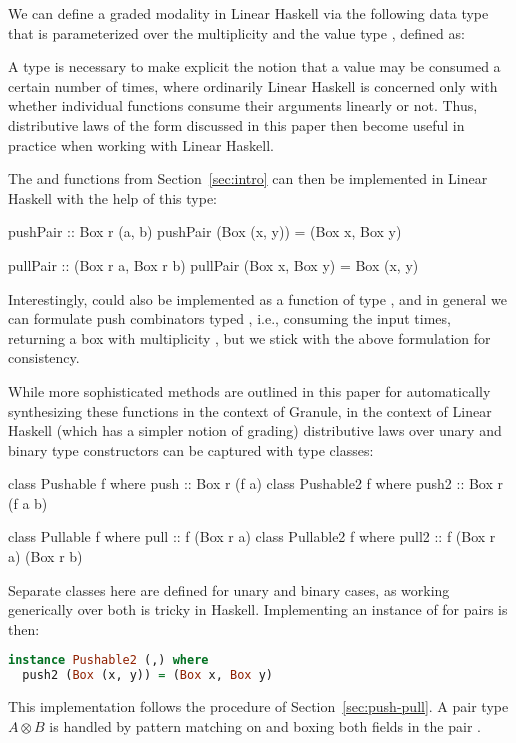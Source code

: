 We can define a graded modality in Linear Haskell
via the following  data type that is parameterized
over the multiplicity  and the value type , defined as:
%
%
A  type is necessary
to make explicit the notion that a value may be consumed a certain number of times,
where ordinarily Linear Haskell is concerned only with whether individual functions
consume their arguments linearly or not.
Thus, distributive laws of the form discussed in this paper
then become useful in practice when working with Linear Haskell.

The  and  functions from Section~\ref{sec:intro}
can then be implemented in Linear Haskell with the help of this  type:
%
\begin{haskell}
pushPair :: Box r (a, b) %
pushPair (Box (x, y)) = (Box x, Box y)
\end{haskell}
%
\begin{haskell}
pullPair :: (Box r a, Box r b) %
pullPair (Box x, Box y) = Box (x, y)
\end{haskell}
%
Interestingly,  could also be implemented as a function of type
, and in general we can formulate
push combinators typed , i.e., consuming
the input  times, returning a box with multiplicity , but
we stick with the above formulation for consistency.

While more sophisticated methods are outlined in this paper for automatically
synthesizing these functions in the context of Granule, in the
context of Linear Haskell (which has a simpler notion of grading) distributive laws over unary and binary type
constructors can be captured with type classes:
%
\begin{haskell}
class Pushable f where
  push :: Box r (f a) %
class Pushable2 f where
  push2 :: Box r (f a b) %

class Pullable f where
   pull :: f (Box r a) %
class Pullable2 f where
  pull2 :: f (Box r a) (Box r b) %
\end{haskell}
%
Separate classes here are defined for unary and binary cases, as working generically
over both is tricky in Haskell.
%
%
Implementing an instance of  for pairs is then:
%
\begin{lstlisting}[language=Haskell]
instance Pushable2 (,) where
  push2 (Box (x, y)) = (Box x, Box y)
\end{lstlisting}
%
This implementation follows the procedure of
Section~\ref{sec:push-pull}.
A pair type $A \otimes B$ is handled by pattern matching on  and boxing both
fields in the pair .


